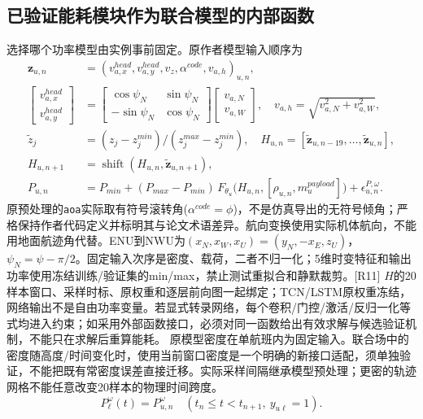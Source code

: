 \subsection*{已验证能耗模块作为联合模型的内部函数}
\noindent 选择哪个功率模型由实例事前固定。原作者模型输入顺序为
\begin{align}
 \mathbf z_{u,n}&=(v^{head}_{a,x},v^{head}_{a,y},v_z,\alpha^{code},v_{a,h})_{u,n},\\
 \begin{bmatrix}v^{head}_{a,x}\\v^{head}_{a,y}\end{bmatrix}
 &=\begin{bmatrix}\cos\psi_N&\sin\psi_N\\-\sin\psi_N&\cos\psi_N\end{bmatrix}
   \begin{bmatrix}v_{a,N}\\v_{a,W}\end{bmatrix},\quad
 v_{a,h}=\sqrt{v_{a,N}^2+v_{a,W}^2},\label{eng:eq:energyfeatures}\\
 \widetilde z_j&=(z_j-z_j^{min})/(z_j^{max}-z_j^{min}),\quad
 H_{u,n}=[\widetilde{\mathbf z}_{u,n-19},\ldots,\widetilde{\mathbf z}_{u,n}],\\
 H_{u,n+1}&=\operatorname{shift}(H_{u,n},\widetilde{\mathbf z}_{u,n+1}),
 \label{eng:eq:energyhistory}\\
 P_{u,n}&=P_{min}+(P_{max}-P_{min})\,
 F_{\theta_u}\big(H_{u,n},[\rho_{u,n},m_u^{payload}]\big)
 +\epsilon^{P,\omega}_{u,n}.\label{eng:eq:power}
\end{align}
\noindent 原预处理的\texttt{aoa}实际取有符号滚转角($\alpha^{code}=\phi$)，不是仿真导出的无符号倾角；严格保持作者代码定义并标明其与论文术语差异。航向变换使用实际机体航向，不能用地面航迹角代替。ENU到NWU为$(x_N,x_W,x_U)=(y_N,-x_E,z_U)$，$\psi_N=\psi-\pi/2$。固定输入次序是密度、载荷，二者不归一化；5维时变特征和输出功率使用冻结训练/验证集的min/max，禁止测试重拟合和静默裁剪。[R11]
\noindent $H$的20样本窗口、采样时标、原权重和逐层前向图一起绑定；TCN/LSTM原权重冻结，网络输出不是自由功率变量。若显式转录网络，每个卷积/门控/激活/反归一化等式均进入约束；如采用外部函数接口，必须对同一函数给出有效求解与候选验证机制，不能只在求解后重算能耗。
\noindent 原模型密度在单航班内为固定输入。联合场中的密度随高度/时间变化时，使用当前窗口密度是一个明确的新接口适配，须单独验证，不能把既有常密度误差直接迁移。实际采样间隔继承模型预处理；更密的轨迹网格不能任意改变20样本的物理时间跨度。
\begin{equation}
 P_\ell^\omega(t)=P_{u,n}^\omega\quad(t_n\le t<t_{n+1},\ y_{u\ell}=1).
 \label{eng:eq:continuouspower}
\end{equation}
